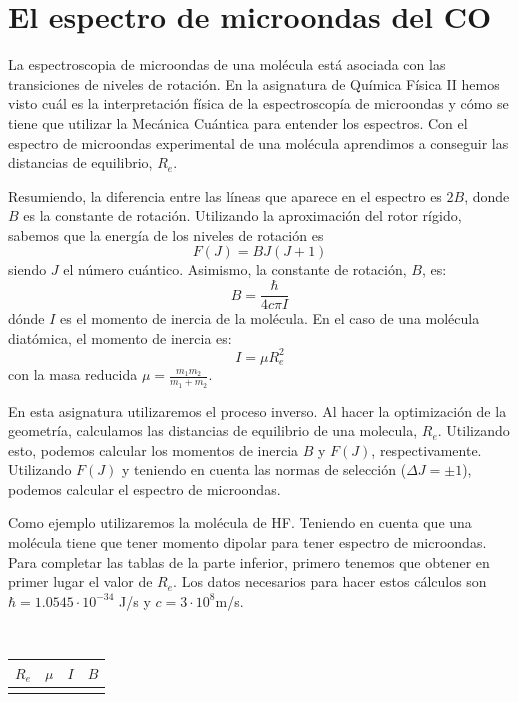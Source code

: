 \documentclass{tufte-book}
\begin{document}
\section{El espectro de microondas del CO}
La espectroscopia de microondas de una molécula está 
asociada con las transiciones de niveles de rotación.
En la asignatura de Química Física II hemos 
visto cuál es la interpretación física de la espectroscopía
de microondas y cómo se tiene que utilizar la Mecánica Cuántica 
para entender los espectros. Con el espectro de microondas
experimental de una molécula aprendimos a conseguir 
las distancias de equilibrio, $R_e$.

Resumiendo, la diferencia entre las líneas que aparece 
en el espectro es $2B$, donde $B$ es la constante de rotación.
Utilizando la aproximación del rotor rígido, sabemos 
que la energía de los niveles de rotación es
\begin{equation}
    F(J) = BJ(J+1)
\end{equation}
siendo $J$ el número cuántico. Asimismo, la constante de 
rotación, $B$, es:
\begin{equation}
    B = \frac{\hbar}{4c\pi I}
\end{equation}
dónde $I$ es el momento de inercia de la molécula. En el 
caso de una molécula diatómica, el momento de inercia es:
\begin{equation}
    I = \mu R_e^2
\end{equation}
con la masa reducida $\mu=\frac{m_1m_2}{m_1+m_2}$.

En esta asignatura utilizaremos el proceso inverso. Al hacer
la optimización de la geometría, calculamos las distancias de
equilibrio de una molecula, $R_e$. Utilizando esto, podemos
calcular los momentos de inercia $B$ y $F(J)$, respectivamente.
Utilizando $F(J)$ y teniendo en cuenta las normas de selección
($\Delta J=\pm1$), podemos calcular el espectro de microondas.

Como ejemplo utilizaremos la molécula de HF. Teniendo en cuenta
que una molécula tiene que tener momento dipolar para tener
espectro de microondas. Para completar las tablas de la parte
inferior, primero tenemos que obtener en primer lugar el valor de
$R_e$. Los datos necesarios para hacer estos cálculos son
$\hbar=1.0545·10^{-34}$ J/s y $c=3·10^8$m/s.

\begin{table}[h!]
\centering 
	\scriptsize
	\begin{tabular}{llll}
	\toprule
	    $R_e$ &$\mu$ & $I$ & $B$  \\
	\midrule	
	     &&  &  \\
	\bottomrule	
    \end{tabular}
\end{table}
\end{document}
